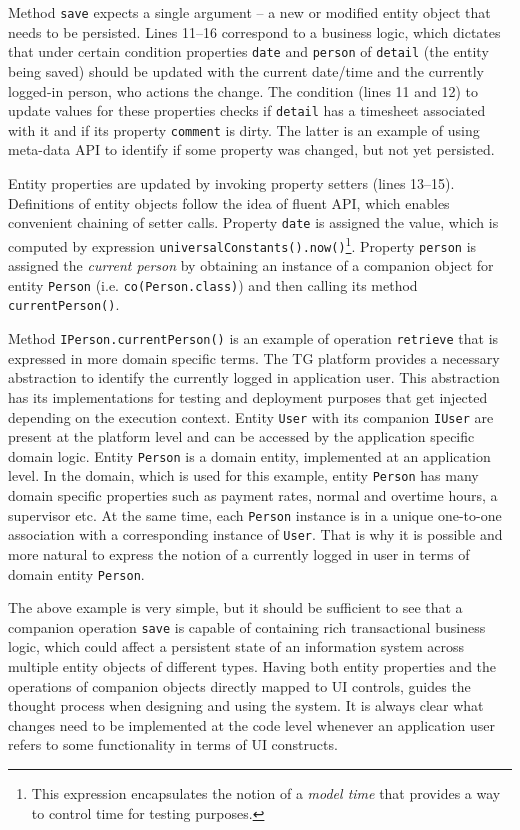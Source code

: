 \documentclass[a4paper,12pt,oneside,openright,final]{memoir} %
\begin{document}
	Method \texttt{save} expects a single argument -- a new or modified entity object that needs to be persisted.
	Lines 11--16 correspond to a business logic, which dictates that under certain condition properties \texttt{date} and \texttt{person} of \texttt{detail} (the entity being saved) should be updated with the current date/time and the currently logged-in person, who actions the change.
	The condition (lines 11 and 12) to update values for these properties checks if \texttt{detail} has a timesheet associated with it and if its property \texttt{comment} is dirty.
	The latter is an example of using meta-data API to identify if some property was changed, but not yet persisted.

	Entity properties are updated by invoking property setters (lines 13--15).
	Definitions of entity objects follow the idea of fluent API, which enables convenient chaining of setter calls.
	Property \texttt{date} is assigned the value, which is computed by expression \texttt{universalConstants().now()}\footnote{This expression encapsulates the notion of a \emph{model time} that provides a way to control time for testing purposes.}.
	Property \texttt{person} is assigned the \emph{current person} by obtaining an instance of a companion object for entity \texttt{Person} (i.e. \texttt{co(Person.class)}) and then calling its method \texttt{currentPerson()}.
	
	Method \texttt{IPerson.currentPerson()} is an example of operation \texttt{retrieve} that is expressed in more domain specific terms.
	The TG platform provides a necessary abstraction to identify the currently logged in application user.
	This abstraction has its implementations for testing and deployment purposes that get injected depending on the execution context.
	Entity \texttt{User} with its companion \texttt{IUser} are present at the platform level and can be accessed by the application specific domain logic.
	Entity \texttt{Person} is a domain entity, implemented at an application level.
	In the domain, which is used for this example, entity \texttt{Person} has many domain specific properties such as payment rates, normal and overtime hours, a supervisor etc.
	At the same time, each \texttt{Person} instance is in a unique one-to-one association with a corresponding instance of \texttt{User}.
	That is why it is possible and more natural to express the notion of a currently logged in user in terms of domain entity \texttt{Person}.
	
	The above example is very simple, but it should be sufficient to see that a companion operation \texttt{save} is capable of containing rich transactional business logic, which could affect a persistent state of an information system across multiple entity objects of different types.
	Having both entity properties and the operations of companion objects directly mapped to UI controls, guides the thought process when designing and using the system.
	It is always clear what changes need to be implemented at the code level whenever an application user refers to some functionality in terms of UI constructs.
	
\end{document}

